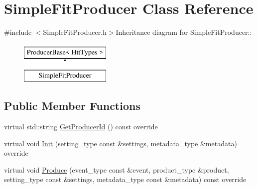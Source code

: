 \hypertarget{classSimpleFitProducer}{
\section{SimpleFitProducer Class Reference}
\label{classSimpleFitProducer}
}


{\ttfamily \#include $<$SimpleFitProducer.h$>$}Inheritance diagram for SimpleFitProducer::\begin{figure}[H]
\begin{center}
\leavevmode
\includegraphics[height=2cm]{classSimpleFitProducer}
\end{center}
\end{figure}
\subsection*{Public Member Functions}
\begin{DoxyCompactItemize}
\item 
virtual std::string \hyperlink{classSimpleFitProducer_a53d443c44930735b041a4bb8d81f38ce}{GetProducerId} () const override
\item 
virtual void \hyperlink{classSimpleFitProducer_a9fa8016129118263dac392e16dc90e97}{Init} (setting\_\-type const \&settings, metadata\_\-type \&metadata) override
\item 
virtual void \hyperlink{classSimpleFitProducer_a32bddf546ffca324de60747761079e6c}{Produce} (event\_\-type const \&event, product\_\-type \&product, setting\_\-type const \&settings, metadata\_\-type const \&metadata) const override
\end{DoxyCompactItemize}


